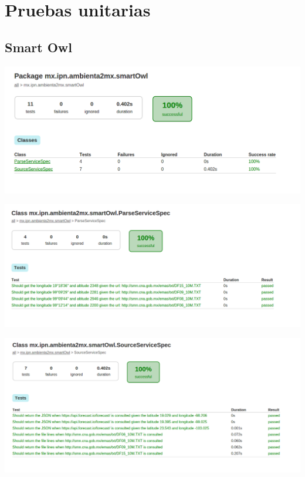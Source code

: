 \newpage
\section*{Pruebas unitarias}
\subsection*{Smart Owl}
\begin{center}
  \includegraphics[width=\textwidth]{images/SmartOwlTest1}
\end{center}

\begin{center}
  \includegraphics[width=\textwidth]{images/SmartOwlTest2}
\end{center}

\begin{center}
  \includegraphics[width=\textwidth]{images/SmartOwlTest3}
\end{center}
%
%
\newpage
